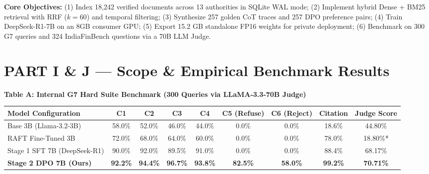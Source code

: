 \documentclass[11pt,a4paper]{article}
\begin{document}
\textbf{Core Objectives:} (1) Index 18,242 verified documents across 13 authorities in SQLite WAL mode; (2) Implement hybrid Dense + BM25 retrieval with RRF ($k=60$) and temporal filtering; (3) Synthesize 257 golden CoT traces and 257 DPO preference pairs; (4) Train DeepSeek-R1-7B on an 8GB consumer GPU; (5) Export 15.2 GB standalone FP16 weights for private deployment; (6) Benchmark on 300 G7 queries and 324 IndiaFinBench questions via a 70B LLM Judge.

\section*{PART I \& J --- Scope \& Empirical Benchmark Results}

\begin{table}[h!]
\centering
\small
\textbf{Table A: Internal G7 Hard Suite Benchmark (300 Queries via LLaMA-3.3-70B Judge)}\\[0.3em]
\scriptsize
\begin{tabularx}{\textwidth}{|l|c|c|c|c|c|c|c|c|}
\hline
\rowcolor{tablehead} \textbf{Model Configuration} & \textbf{C1} & \textbf{C2} & \textbf{C3} & \textbf{C4} & \textbf{C5 (Refuse)} & \textbf{C6 (Reject)} & \textbf{Citation} & \textbf{Judge Score} \\ \hline
Base 3B (Llama-3.2-3B) & 58.0\% & 52.0\% & 46.0\% & 44.0\% & 0.0\% & 0.0\% & 18.6\% & 44.80\% \\ \hline
RAFT Fine-Tuned 3B & 72.0\% & 68.0\% & 64.0\% & 60.0\% & 0.0\% & 0.0\% & 78.0\% & 18.80\%* \\ \hline
Stage 1 SFT 7B (DeepSeek-R1) & 90.0\% & 92.0\% & 89.5\% & 91.0\% & 0.0\% & 0.0\% & 88.4\% & 68.17\% \\ \hline
\rowcolor{tablehighlight} \textbf{Stage 2 DPO 7B (Ours)} & \textbf{92.2\%} & \textbf{94.4\%} & \textbf{96.7\%} & \textbf{93.8\%} & \textbf{82.5\%} & \textbf{58.0\%} & \textbf{99.2\%} & \textbf{70.71\%} \\ \hline
\end{tabularx}
\end{table}
\end{document}
